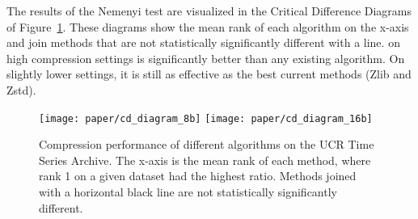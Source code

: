 The results of the Nemenyi test are visualized in the Critical Difference Diagrams \cite{cdDiagrams} of Figure~\ref{fig:ratioCD}. These diagrams show the mean rank of each algorithm on the x-axis and join methods that are not statistically significantly different with a line. \minesp on high compression settings is significantly better than any existing algorithm. On slightly lower settings, it is still as effective as the best current methods (Zlib and Zstd).





\begin{figure}[h]
\begin{center}
    \texttt{[image: paper/cd\_diagram\_8b]}
    \texttt{[image: paper/cd\_diagram\_16b]}
    \caption{Compression performance of different algorithms on the UCR Time Series Archive. The x-axis is the mean rank of each method, where rank 1 on a given dataset had the highest ratio. Methods joined with a horizontal black line are not statistically significantly different.}
    \label{fig:ratioCD}
\end{center}
\end{figure}

